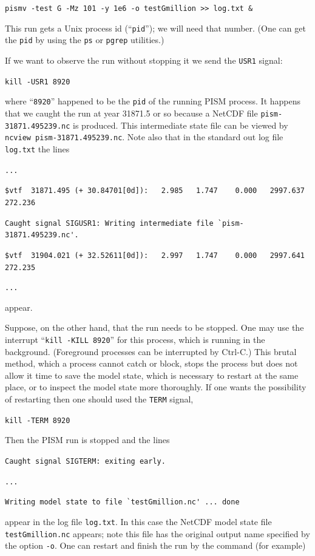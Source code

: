 \documentclass[11pt,final]{amsart}
\begin{document}
\verb|pismv -test G -Mz 101 -y 1e6 -o testGmillion >> log.txt &|

\noindent This run gets a Unix process id (``\verb|pid|''); we will need that number.  (One can get the \verb|pid| by using the \verb|ps| or \verb|pgrep| utilities.)

If we want to observe the run without stopping it we send the \verb|USR1| signal:

\verb|kill -USR1 8920|

\noindent where ``\verb|8920|'' happened to be the \verb|pid| of the running PISM process.  It happens that we caught the run at year 31871.5 or so because a NetCDF file \verb|pism-31871.495239.nc| is produced.  This intermediate state file can be viewed by \verb|ncview pism-31871.495239.nc|.  Note also that in the standard out log file \verb|log.txt| the lines

\verb|...|

\verb|$vtf  31871.495 (+ 30.84701[0d]):   2.985   1.747    0.000   2997.637   272.236|

\verb|Caught signal SIGUSR1: Writing intermediate file `pism-31871.495239.nc'.|

\verb|$vtf  31904.021 (+ 32.52611[0d]):   2.997   1.747    0.000   2997.641   272.235|

\verb|...|

\noindent appear.

Suppose, on the other hand, that the run needs to be stopped.  One may use the interrupt ``\verb|kill -KILL 8920|'' for this process, which is running in the background.  (Foreground processes can be interrupted by Ctrl-C.)  This brutal method, which a process cannot catch or block, stops the process but does not allow it  time to save the model state, which is necessary to restart at the same place, or to inspect the model state more thoroughly.  If one wants the possibility of restarting then one should used the \verb|TERM| signal, 

\verb|kill -TERM 8920|

\noindent Then the PISM run is stopped and the lines

\verb|Caught signal SIGTERM: exiting early.|

\verb|...|

\verb|Writing model state to file `testGmillion.nc' ... done|

\noindent appear in the log file \verb|log.txt|.  In this case the NetCDF model state file \verb|testGmillion.nc| appears; note this file has the original output name specified by the option \verb|-o|.  One can restart and finish the run by the command (for example)
\end{document}
